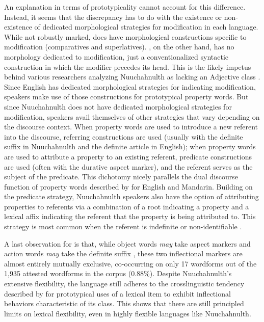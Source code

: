 An explanation in terms of prototypicality cannot account for this difference. Instead, it seems that the discrepancy has to do with the existence or non-existence of dedicated morphological strategies for modification in each language. While not robustly marked,  does have morphological constructions specific to modification (comparatives and superlatives). , on the other hand, has no morphology dedicated to modification, just a conventionalized syntactic construction in which the modifier precedes its head. This is the likely impetus behind various researchers analyzing Nuuchahnulth as lacking an Adjective class \parencite[e.g.][]{Nakayama2001}. Since English has dedicated morphological strategies for indicating modification, speakers make use of those constructions for prototypical property words. But since Nuuchahnulth does not have dedicated morphological strategies for modification, speakers avail themselves of other strategies that vary depending on the discourse context. When property words are used to introduce a new referent into the discourse, referring constructions are used (usually with the definite suffix  in Nuuchahnulth and the definite article in English); when property words are used to attribute a property to an existing referent, predicate constructions are used (often with the durative aspect marker), and the referent serves as the subject of the predicate. This dichotomy nicely parallels the dual discourse function of property words described by \textcite{Thompson1989} for English and Mandarin. Building on the predicate strategy, Nuuchahnulth speakers also have the option of attributing properties to referents via a combination of a root indicating a property and a lexical affix indicating the referent that the property is being attributed to. This strategy is most common when the referent is indefinite or non-identifiable \parencite[144]{Nakayama2001}.

A last observation for  is that, while object words \emph{may} take aspect markers and action words \emph{may} take the definite suffix , these two inflectional markers are almost entirely mutually exclusive, co-occurring on only 17 wordforms out of the 1,935 attested wordforms in the corpus (0.88\%). Despite Nuuchahnulth's extensive flexibility, the language still adheres to the crosslinguistic tendency described by \textcite{HopperThompson1984} for prototypical uses of a lexical item to exhibit inflectional behaviors characteristic of its class. This shows that there are still principled limits on lexical flexibility, even in highly flexible languages like Nuuchahnulth.

